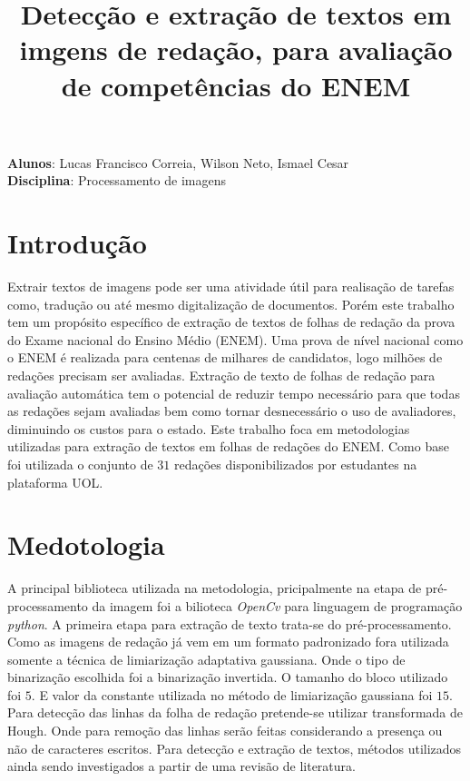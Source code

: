 \documentclass[12pt,a4]{article}
\title{Detecção e extração de textos em imgens de redação, para avaliação de competências do ENEM}
\date{}
\begin{document}
\maketitle
\begin{center}
\textbf{Alunos}: Lucas Francisco Correia, Wilson Neto,  Ismael Cesar \\
\textbf{Disciplina}: Processamento de imagens
\end{center}


\section{Introdução}
\label{sec:introdcao}
	Extrair textos de imagens pode ser uma atividade útil para realisação de tarefas como, tradução ou até mesmo digitalização de documentos.
	Porém este trabalho tem um propósito específico de extração de textos de folhas de redação da prova do Exame nacional do Ensino Médio (ENEM).
	Uma prova de nível nacional como o ENEM é realizada para centenas de milhares de candidatos, logo milhões de redações precisam ser avaliadas.
	Extração de texto de folhas de redação para avaliação automática tem o potencial de reduzir tempo necessário para que todas as redações sejam avaliadas bem como tornar desnecessário o uso de avaliadores, diminuindo os custos para o estado. 
	Este trabalho foca em metodologias utilizadas para extração de textos em folhas de redações do ENEM.
	Como base foi utilizada o conjunto de $31$ redações disponibilizados por estudantes na plataforma UOL. 
	

\section{Medotologia}
\label{sec:metodologia}
	A principal biblioteca utilizada na metodologia, pricipalmente na etapa de pré-processamento da imagem foi a bilioteca \textit{OpenCv}\cite{opencv_library} para linguagem de programação \textit{python}.
	A primeira etapa para extração de texto trata-se do pré-processamento. 
	Como as imagens de redação já vem em um formato padronizado fora utilizada somente a técnica de limiarização adaptativa gaussiana. 
	Onde o tipo de binarização escolhida foi a binarização invertida. 
	O tamanho do bloco utilizado foi $5$.
	E valor da constante utilizada no método de limiarização gaussiana foi $15$.
	Para detecção das linhas da folha de redação pretende-se utilizar transformada de Hough. 
	Onde para remoção das linhas serão feitas considerando a presença ou não de caracteres escritos.
	Para detecção e extração de textos, métodos utilizados ainda sendo investigados a partir de uma revisão de literatura.
		
	
	


\end{document}
